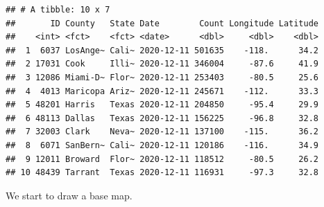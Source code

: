 \documentclass[]{book}
\newenvironment{Shaded}{\begin{snugshade}}{\end{snugshade}}
\newcommand{\KeywordTok}[1]{\textcolor[rgb]{0.13,0.29,0.53}{\textbf{#1}}}
\newcommand{\DataTypeTok}[1]{\textcolor[rgb]{0.13,0.29,0.53}{#1}}
\newcommand{\DecValTok}[1]{\textcolor[rgb]{0.00,0.00,0.81}{#1}}
\newcommand{\FloatTok}[1]{\textcolor[rgb]{0.00,0.00,0.81}{#1}}
\newcommand{\StringTok}[1]{\textcolor[rgb]{0.31,0.60,0.02}{#1}}
\newcommand{\CommentTok}[1]{\textcolor[rgb]{0.56,0.35,0.01}{\textit{#1}}}
\newcommand{\OperatorTok}[1]{\textcolor[rgb]{0.81,0.36,0.00}{\textbf{#1}}}
\newcommand{\NormalTok}[1]{#1}
\begin{document}
\begin{Shaded}
\end{Shaded}

\begin{verbatim}
## # A tibble: 10 x 7
##       ID County   State Date        Count Longitude Latitude
##    <int> <fct>    <fct> <date>      <dbl>     <dbl>    <dbl>
##  1  6037 LosAnge~ Cali~ 2020-12-11 501635    -118.      34.2
##  2 17031 Cook     Illi~ 2020-12-11 346004     -87.6     41.9
##  3 12086 Miami-D~ Flor~ 2020-12-11 253403     -80.5     25.6
##  4  4013 Maricopa Ariz~ 2020-12-11 245671    -112.      33.3
##  5 48201 Harris   Texas 2020-12-11 204850     -95.4     29.9
##  6 48113 Dallas   Texas 2020-12-11 156225     -96.8     32.8
##  7 32003 Clark    Neva~ 2020-12-11 137100    -115.      36.2
##  8  6071 SanBern~ Cali~ 2020-12-11 120186    -116.      34.9
##  9 12011 Broward  Flor~ 2020-12-11 118512     -80.5     26.2
## 10 48439 Tarrant  Texas 2020-12-11 116931     -97.3     32.8
\end{verbatim}

We start to draw a base map.

\begin{Shaded}
\end{Shaded}
\end{document}
